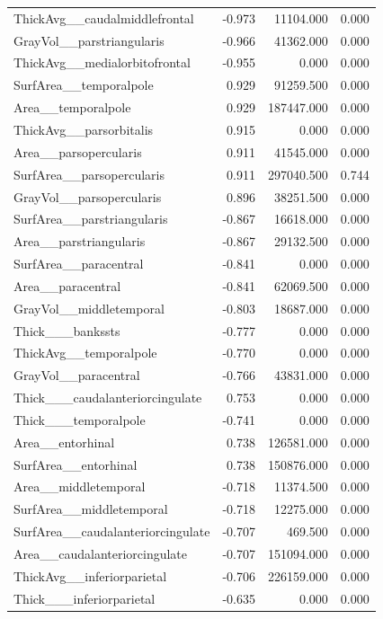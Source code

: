 \documentclass{article}
\begin{document}
\begin{longtable}{lrrr}
	ThickAvg\_\_caudalmiddlefrontal & -0.973 & 11104.000 & 0.000 \\
	GrayVol\_\_parstriangularis & -0.966 & 41362.000 & 0.000 \\
	ThickAvg\_\_medialorbitofrontal & -0.955 & 0.000 & 0.000 \\
	SurfArea\_\_temporalpole & 0.929 & 91259.500 & 0.000 \\
	Area\_\_temporalpole & 0.929 & 187447.000 & 0.000 \\
	ThickAvg\_\_parsorbitalis & 0.915 & 0.000 & 0.000 \\
	Area\_\_parsopercularis & 0.911 & 41545.000 & 0.000 \\
	SurfArea\_\_parsopercularis & 0.911 & 297040.500 & 0.744 \\
	GrayVol\_\_parsopercularis & 0.896 & 38251.500 & 0.000 \\
	SurfArea\_\_parstriangularis & -0.867 & 16618.000 & 0.000 \\
	Area\_\_parstriangularis & -0.867 & 29132.500 & 0.000 \\
	SurfArea\_\_paracentral & -0.841 & 0.000 & 0.000 \\
	Area\_\_paracentral & -0.841 & 62069.500 & 0.000 \\
	GrayVol\_\_middletemporal & -0.803 & 18687.000 & 0.000 \\
	Thick\_\_\_bankssts & -0.777 & 0.000 & 0.000 \\
	ThickAvg\_\_temporalpole & -0.770 & 0.000 & 0.000 \\
	GrayVol\_\_paracentral & -0.766 & 43831.000 & 0.000 \\
	Thick\_\_\_caudalanteriorcingulate & 0.753 & 0.000 & 0.000 \\
	Thick\_\_\_temporalpole & -0.741 & 0.000 & 0.000 \\
	Area\_\_entorhinal & 0.738 & 126581.000 & 0.000 \\
	SurfArea\_\_entorhinal & 0.738 & 150876.000 & 0.000 \\
	Area\_\_middletemporal & -0.718 & 11374.500 & 0.000 \\
	SurfArea\_\_middletemporal & -0.718 & 12275.000 & 0.000 \\
	SurfArea\_\_caudalanteriorcingulate & -0.707 & 469.500 & 0.000 \\
	Area\_\_caudalanteriorcingulate & -0.707 & 151094.000 & 0.000 \\
	ThickAvg\_\_inferiorparietal & -0.706 & 226159.000 & 0.000 \\
	Thick\_\_\_inferiorparietal & -0.635 & 0.000 & 0.000 \\

\end{longtable}
\end{document}
